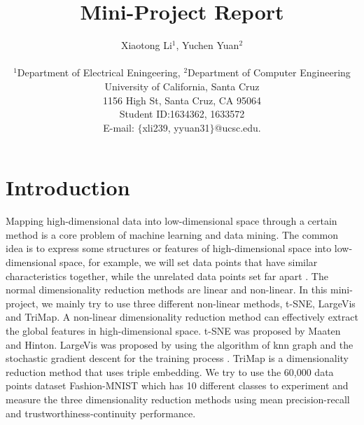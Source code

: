 \documentclass[12pt]{article}
\title{Mini-Project Report}
\author
{Xiaotong Li$^{1}$,  Yuchen Yuan$^{2}$ \\
\\
\normalsize{$^{1}$Department of Electrical Eningeering, $^{2}$Department of Computer Engineering}\\
\normalsize{University of California, Santa Cruz}\\
\normalsize{1156 High St, Santa Cruz, CA 95064}\\
\normalsize{Student ID:1634362, 1633572}\\
\normalsize{E-mail:  $\{$xli239, yyuan31$\}$@ucsc.edu.}
}
\date{}
\begin{document}
 


\baselineskip24pt


\maketitle 







\section*{Introduction}

Mapping high-dimensional data into low-dimensional space through a certain method is a core problem of machine learning and data mining\cite{LargeVis}. The common idea is to express some structures or features of high-dimensional space into low-dimensional space, for example, we will set data points that have similar characteristics together, while the unrelated data points set far apart . The normal dimensionality reduction methods are linear and non-linear. In this mini-project, we mainly try to use three different non-linear methods, t-SNE, LargeVis and TriMap. A non-linear dimensionality reduction method can effectively extract the global features in high-dimensional space. t-SNE was proposed by Maaten and Hinton\cite{t-SNE}. LargeVis was proposed by using the algorithm of knn graph and the stochastic gradient descent for the training process \cite{LargeVis}. TriMap is a dimensionality reduction method that uses triple embedding\cite{TriMap}. We try to use the 60,000 data points dataset Fashion-MNIST which has 10 different classes to experiment and measure the three dimensionality reduction methods using mean precision-recall and trustworthiness-continuity performance.
\end{document}
